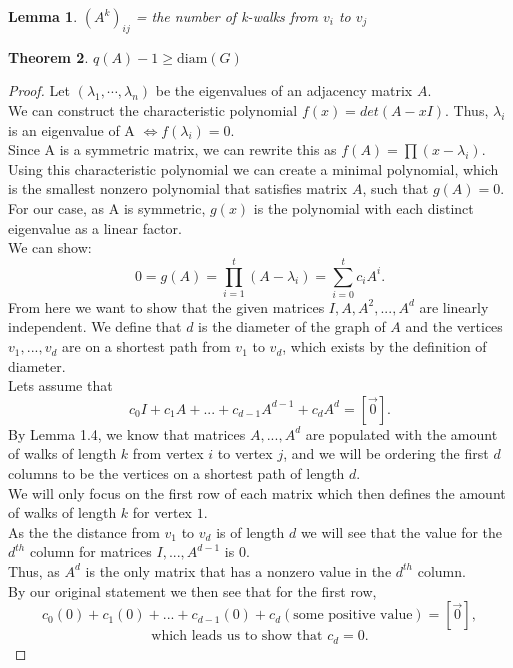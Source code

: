 \documentclass{article}
\newtheorem{theorem}{Theorem}[section]
\newtheorem{lemma}[theorem]{Lemma}
\begin{document}
\begin{lemma}
$(A^k)_{ij}$ = the number of k-walks from $v_i$ to $v_j$
\end{lemma}

\begin{theorem}
$q(A) - 1 \geq \mathrm{diam}(G)$
\end{theorem}

\begin{proof}
    Let $(\lambda_1,\cdots, \lambda_n)$ be the eigenvalues of an adjacency matrix $A$. \\
    We can construct the characteristic polynomial $f(x) = det(A - xI)$. Thus, $\lambda_i$ is an eigenvalue of A $\iff f(\lambda_i) = 0$. \\
    Since A is a symmetric matrix, we can rewrite this as $f(A) = \prod(x - \lambda_i)$.\\
    Using this characteristic polynomial we can create a minimal polynomial, which is the smallest nonzero polynomial that satisfies matrix $A$, such that $g(A) = 0$.  For our case, as A is symmetric, $g(x)$ is the polynomial with each distinct eigenvalue as a linear factor.\\
    We can show: $$0 = g(A) = \prod^t_{i=1}(A-\lambda_i) = \sum^t_{i=0} c_iA^i.$$
    From here we want to show that the given matrices $I, A, A^2, ..., A^d$ are linearly independent.  We define that $d$ is the diameter of the graph of $A$ and the vertices $v_1,...,v_d$ are on a shortest path from $v_1$ to $v_d$, which exists by the definition of diameter.\\
    Lets assume that $$c_0I + c_1A + ... + c_{d-1}A^{d-1}+ c_dA^d = [\Vec{0}].$$
    By Lemma 1.4, we know that matrices $A, ..., A^d$ are populated with the amount of walks of length $k$ from vertex $i$ to vertex $j$, and we will be ordering the first $d$ columns to be the vertices on a shortest path of length $d$. \\
    We will only focus on the first row of each matrix which then defines the amount of walks of length $k$ for vertex $1$. \\
    As the the distance from $v_1$ to $v_d$ is of length $d$ we will see that the value for the $d^{th}$ column for matrices $I, ..., A^{d-1}$ is 0. \\
    Thus, as $A^d$ is the only matrix that has a nonzero value in the $d^{th}$ column. \\
    By our original statement we then see that for the first row, $$c_0(0) + c_1(0) + ... + c_{d-1}(0)+ c_d(\text{some positive value}) = [\Vec{0}],$$$$\text{which leads us to show that }c_d = 0.$$

\end{proof}
\end{document}
